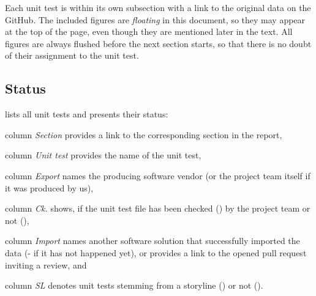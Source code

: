 \documentclass{scrartcl}
\newcommand{\jaja}{\ding{51}}
\newcommand{\nope}{\ding{55}}
\begin{document}
Each unit test is within its own subsection with a link to the original data on the GitHub.
The included figures are \emph{floating} in this document, so they may appear at the top of the page,
 even though they are mentioned later in the text.
All figures are always flushed before the next section starts, so that there is no doubt of their assignment to the unit test.

\subsection{Status}
\label{sec:status}

 lists all unit tests and presents their status:
\begin{compactitem}
  \item column \emph{Section} provides a link to the corresponding section in the report,
  \item column \emph{Unit test} provides the name of the unit test,
  \item column \emph{Export} names the producing software vendor (or the project team itself if it was produced by us),
  \item column \emph{Ck.} shows, if the unit test file has been checked (\jaja) by the project team or not (\nope),
  \item column \emph{Import} names another software solution that successfully imported the data (- if it has not happened yet), or provides a link to the opened pull request inviting a review, and
  \item column \emph{SL} denotes unit tests stemming from a storyline (\jaja) or not (\nope).
\end{compactitem}
\end{document}
